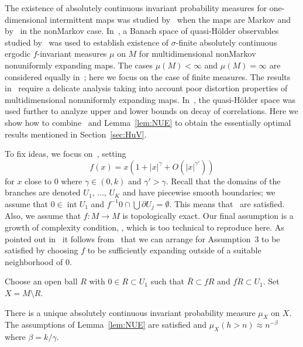 \documentclass[10pt]{amsart}
\theoremstyle{definition}\newtheorem{defi}[theo]{Definition}\newtheorem{rema}[theo]{Remark}\newtheorem{exam}[theo]{Example}\newtheorem{exem}[theo]{Example}\newtheorem{nota}[theo]{Notation}
\DeclareMathOperator{\Int}{int}
\newcommand*{\MK}{\mkern 2mu}
\begin{document}
The existence of absolutely continuous invariant probability measures for one-dimensional intermittent maps was studied by~\cite{Thaler80} when the maps are Markov and by~\cite{Zweimuller98} in the nonMarkov case. In~\cite{HuVaienti09}, a Banach space of quasi-H\"older observables studied by~\cite{Keller85,Saussol00} was used to establish existence of $\sigma$-finite absolutely continuous ergodic $f$-invariant measures $\mu$ on $M$ for multidimensional nonMarkov nonuniformly expanding maps. The cases $\mu(M)<\infty$ and $\mu(M)=\infty$ are considered equally in~\cite{HuVaienti09}; here we focus on the case of finite measures. The results in~\cite{HuVaienti09} require a delicate analysis taking into account poor distortion properties of multidimensional nonuniformly expanding maps. In~\cite{HuVaientiapp}, the quasi-H\"older space was used further to analyze upper and lower bounds on decay of correlations. Here we show how to combine~\cite{HuVaienti09} and Lemma~\ref{lem:NUE} to obtain the essentially optimal results mentioned in Section~\ref{sec:HuV}.


To fix ideas, we focus on~\cite[Example~5.1]{HuVaientiapp}, setting
\[
f(x)=x\left(1+|x|^\gamma+O\left(|x|^{\gamma'}\right)\right)
\]
for $x$ close to $0$ where $\gamma\in(0,k)$ and $\gamma'>\gamma$. Recall that the domains of the branches are denoted $U_1,\,\dots,\,U_K$ and have piecewise smooth boundaries; we assume that $0\in\Int U_1$ and $f^{-1}0\cap \bigcup\partial U_j=\emptyset$. This means that~\cite[Theorem~A$\MK$(Assumptions~1 and~2)]{HuVaienti09} are satisfied. Also, we assume that $f:M\to M$ is topologically exact. Our final assumption is a growth of complexity condition, \cite[Theorem~A$\MK$(Assumption~3)]{HuVaienti09}, which is too technical to reproduce here. As pointed out in~\cite[Remark~5.2]{HuVaientiapp} it follows from~\cite[Lemma~2.1]{Saussol00} that we can arrange for Assumption~3 to be satisfied by choosing $f$ to be sufficiently expanding outside of a suitable neighborhood of $0$.

Choose an open ball $R$ with $0\in R\subset U_1$ such that $\bar R\subset fR$ and $\overline{fR}\subset U_1$. Set $X=M\setminus R$.

\begin{prop}\label{prop:HuV}
There is a unique absolutely continuous invariant probability measure $\mu_X$ on $X$. The assumptions of Lemma~\ref{lem:NUE} are satisfied and $\mu_X(h>n)\approx n^{-\beta}$ where $\beta=k/\gamma$.
\end{prop}
\end{document}
